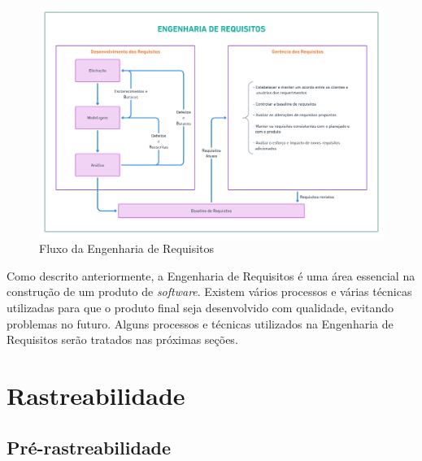 \begin{itemize}
    \begin{figure}[htb]
        \begin{center}
            \caption{Fluxo da Engenharia de Requisitos}
            \label{eng_req_flux}
            \includegraphics[scale=0.15]{figuras/Embasamento/eng_req_fluxo.png}
        \end{center}
    \end{figure}
    
\end{itemize}

Como descrito anteriormente, a Engenharia de Requisitos é uma área essencial na construção de um produto de \textit{software}. Existem vários processos e várias técnicas utilizadas para que o produto final seja desenvolvido com qualidade, evitando problemas no futuro. Alguns processos e técnicas utilizados na Engenharia de Requisitos serão tratados nas próximas seções.

\section{Rastreabilidade}

\label{sec:rastreabilidade}

\subsection{Pré-rastreabilidade}

\label{sec:pre-rastreabilidade}

